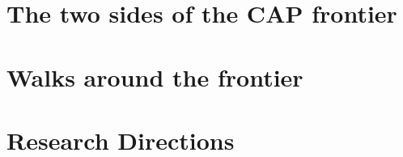 \begin{bibunit}
        \section{The two sides of the CAP frontier}\label{sec:2}


        \section{Walks around the frontier}\label{sec:2}


        \section{Research Directions}\label{sec:2}

	
	

\end{bibunit}
